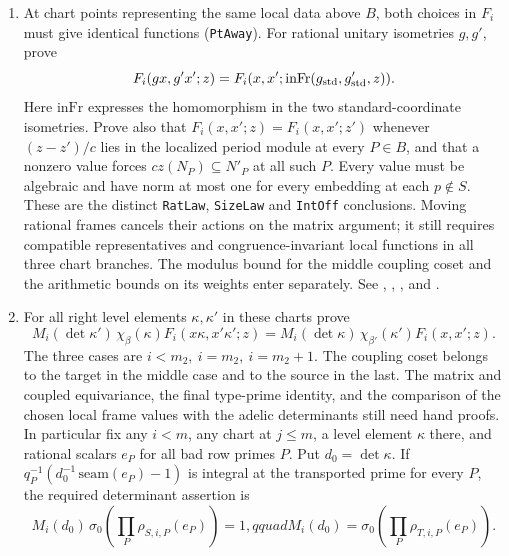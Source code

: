 \begin{enumerate}
\item At chart points representing the same local data above \(B\), both choices in \(F_i\) must give identical functions (\nolinkurl{PtAway}). For rational unitary isometries \(g,g'\), prove
\[
 F_i(gx,g'x';z)=F_i(x,x';\mathrm{inFr}(g_{\rm std},g'_{\rm std},z)).
\]
Here \(\mathrm{inFr}\) expresses the homomorphism in the two standard-coordinate isometries. Prove also that \(F_i(x,x';z)=F_i(x,x';z')\) whenever \((z-z')/c\) lies in the localized period module at every \(P\in B\), and that a nonzero value forces \(cz(N_P)\subseteq N'_P\) at all such \(P\). Every value must be algebraic and have norm at most one for every embedding at each \(p\notin S\). These are the distinct \nolinkurl{RatLaw}, \nolinkurl{SizeLaw} and \nolinkurl{IntOff} conclusions. Moving rational frames cancels their actions on the matrix argument; it still requires compatible representatives and congruence-invariant local functions in all three chart branches. The modulus bound for the middle coupling coset and the arithmetic bounds on its weights enter separately. See , , ,  and .
\item For all right level elements \(\kappa,\kappa'\) in these charts prove
\[
 M_i(\det\kappa')\,\chi_\beta(\kappa) F_i(x\kappa,x'\kappa';z)
 =M_i(\det\kappa)\,\chi_{\beta'}(\kappa')F_i(x,x';z).
\]
The three cases are \(i<m_2,\ i=m_2,\ i=m_2+1\). The coupling coset belongs to the target in the middle case and to the source in the last. The matrix and coupled equivariance, the final type-prime identity, and the comparison of the chosen local frame values with the adelic determinants still need hand proofs. In particular fix any \(i<m\), any chart at \(j\le m\), a level element \(\kappa\) there, and rational scalars \(e_P\) for all bad row primes \(P\). Put \(d_0=\det\kappa\). If \(q_P^{-1}(d_0^{-1}\,\mathrm{seam}(e_P)-1)\) is integral at the transported prime for every \(P\), the required determinant assertion is
\[
 M_i(d_0)\,\sigma_0\!\left(\prod_P\rho_{S,i,P}(e_P)\right)=1,qquad
 M_i(d_0)=\sigma_0\!\left(\prod_P\rho_{T,i,P}(e_P)\right).
\]

\end{enumerate}
